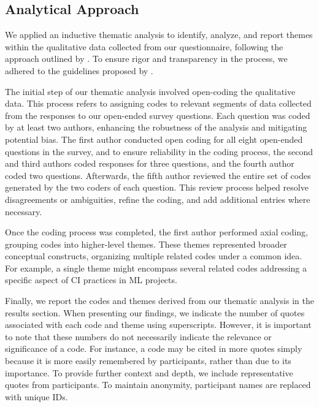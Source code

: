 \subsection{Analytical Approach}

We applied an inductive thematic analysis to identify, analyze, and report themes within the qualitative data collected from our questionnaire, following the approach outlined by \cite{braun2006using}. To ensure rigor and transparency in the process, we adhered to the guidelines proposed by \cite{nowell2017thematic}.

The initial step of our thematic analysis involved open-coding the qualitative data. This process refers to assigning codes to relevant segments of data collected from the responses to our open-ended survey questions. Each question was coded by at least two authors, enhancing the robustness of the analysis and mitigating potential bias.
The first author conducted open coding for all eight open-ended questions in the survey, and to ensure reliability in the coding process, the second and third authors coded responses for three questions, and the fourth author coded two questions. 
Afterwards, the fifth author reviewed the entire set of codes generated by the two coders of each question. This review process helped resolve disagreements or ambiguities, refine the coding, and add additional entries where necessary.

Once the coding process was completed, the first author performed axial coding, grouping codes into higher-level themes. These themes represented broader conceptual constructs, organizing multiple related codes under a common idea. For example, a single theme might encompass several related codes addressing a specific aspect of CI practices in ML projects.



Finally, we report the codes and themes derived from our thematic analysis in the results section.
When presenting our findings, we indicate the number of quotes associated with each code and theme using superscripts. 
However, it is important to note that these numbers do not necessarily indicate the relevance or significance of a code. For instance, a code may be cited in more quotes simply because it is more easily remembered by participants, rather than due to its importance.
To provide further context and depth, we include representative quotes from participants. To maintain anonymity, participant names are replaced with unique IDs.

